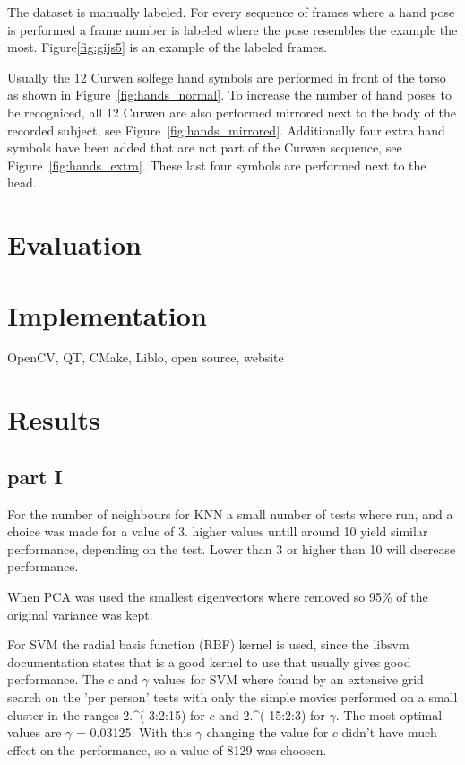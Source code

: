 The dataset is manually labeled. For every sequence of frames where a hand pose is performed a frame number is labeled where the pose resembles the example the most. Figure\ref{fig:gijs5} is an example of the labeled frames.

Usually the 12 Curwen solfege hand symbols are performed in front of the torso as shown in Figure~\ref{fig:hands_normal}. To increase the number of hand poses to be recogniced, all 12 Curwen are also performed mirrored next to the body of the recorded subject, see Figure~\ref{fig:hands_mirrored}. Additionally four extra hand symbols have been added that are not part of the Curwen sequence, see Figure~\ref{fig:hands_extra}. These last four symbols are performed next to the head.

\section{Evaluation}


\section{Implementation}
OpenCV, QT, CMake, Liblo, open source, website

\section{Results}

\subsection{part I}
For the number of neighbours for KNN a small number of tests where run, and a choice was made for a value of 3. higher values untill around 10 yield similar performance, depending on the test. Lower than 3 or higher than 10 will decrease performance.

When PCA was used the smallest eigenvectors where removed so 95\% of the original variance was kept.

For SVM the radial basis function (RBF) kernel is used, since the libsvm documentation states that is a good kernel to use that usually gives good performance. The $c$ and $\gamma$ values for SVM where found by an extensive grid search on the 'per person' tests with only the simple movies performed on a small cluster in the ranges 2.^(-3:2:15) for $c$ and 2.^(-15:2:3) for $\gamma$. The most optimal values are $\gamma$ = 0.03125. With this $\gamma$ changing the value for $c$ didn't have much effect on the performance, so a value of 8129 was choosen.

